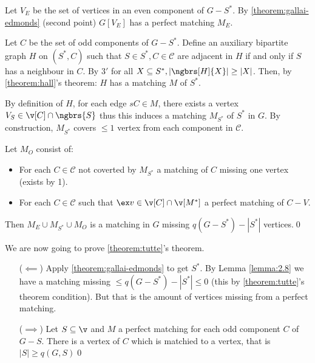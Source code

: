 \begin{prf}
    Let $V_E$ be the set of vertices in an even component of $G - S^*$. By \ref{theorem:gallai-edmonds} (second point) $G[V_E]$ has a perfect matching $M_E$.

    Let $C$ be the set of odd components of $G - S^*$. Define an auxiliary bipartite graph $H$ on $(S^*, C)$ such that $S \in S^*, C \in \mathcal{C}$ are adjacent in $H$ if and only if $S$ has a neighbour in $C$. By $3'$ for all $X \subseteq S^*, |\ngbrs[H]{X}| \geq |X|$. Then, by \ref{theorem:hall}'s theorem: $H$ has a matching $M$ of $S^*$.

    By definition of $H$, for each edge $sC \in M$, there exists a vertex $V_S \in \v[C] \cap \ngbrs{S}$ thus this induces a matching $M_{S^*}$ of $S^*$ in $G$. By construction, $M_{S^*}$ covers $\leq 1$ vertex from each component in $\mathcal{C}$.

    Let $M_O$ consist of:
    \begin{itemize}
        \item For each $C \in \mathcal{C}$ not coverted by $M_{S^*}$ a matching of $C$ missing one vertex (exists by 1).
        \item For each $C \in \mathcal{C}$ such that $\ex v \in \v[C] \cap \v[M^*]$ a perfect matching of $C - V$.
    \end{itemize}
    Then $M_E \cup M_{S^*} \cup M_O$ is a matching in $G$ missing $\mathit{q}(G - S^*) - |S^*|$ vertices.\qed
\end{prf}
\begin{prf}
    We are now going to prove \ref{theorem:tutte}'s theorem.
    \begin{itemize}
        \item[($\impliedby$)] Apply \ref{theorem:gallai-edmonds} to get $S^*$. By Lemma \ref{lemma:2.8} we have a matching missing $\leq \mathit{q}(G - S^*) - |S^*| \leq 0$ (this by \ref{theorem:tutte}'s theorem condition). But that is the amount of vertices missing from a perfect matching.
        \item[($\implies$)] Let $S \subseteq \v$ and $M$ a perfect matching for each odd component $C$ of $G - S$. There is a vertex of $C$ which is matchied to a vertex, that is $|S| \geq \mathit{q}(G, S)$\qed
    \end{itemize}
\end{prf}